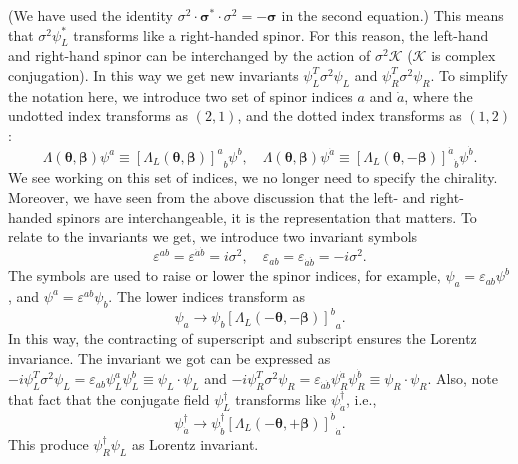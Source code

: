 \documentclass[aps,prb,superscriptaddress,nofootinbib]{revtex4}
\begin{document}
(We have used the identity $\sigma^2 \cdot \bm\sigma^* \cdot\sigma^2 = -\bm\sigma$ in the second equation.) This means that $\sigma^2 \psi_L^*$ transforms like a right-handed spinor.
For this reason, the left-hand and right-hand spinor can be interchanged by the action of $\sigma^2 \mathcal K$ ($\mathcal K$ is complex conjugation).
In this way we get new invariants $\psi_L^T \sigma^2 \psi_L$ and $\psi_R^T \sigma^2 \psi_R$.
To simplify the notation here, we introduce two set of spinor indices $a$ and $\dot a$, where the undotted index transforms as $(2,1)$, and the dotted index transforms as $(1,2)$:
\begin{equation}
	\Lambda(\bm\theta,\bm\beta) \psi^a \equiv {[\Lambda_L(\bm\theta,\bm\beta)]^a}_b \psi^b, \quad
	\Lambda(\bm\theta,\bm\beta) \psi^{\dot a} \equiv {[\Lambda_L(\bm\theta,-\bm\beta)]^{\dot a}}_{\dot b} \psi^{\dot b}.
\end{equation}
We see working on this set of indices, we no longer need to specify the chirality.
Moreover, we have seen from the above discussion that the left- and right- handed spinors are interchangeable, it is the representation that matters.
To relate to the invariants we get, we introduce two invariant symbols
\begin{equation}
	\varepsilon^{ab} = \varepsilon^{\dot a \dot b} = i\sigma^2, \quad
	\varepsilon_{ab} = \varepsilon_{\dot a \dot b} = -i\sigma^2.
\end{equation}
The symbols are used to raise or lower the spinor indices, for example, $\psi_a = \varepsilon_{ab}\psi^b$, and $\psi^a = \varepsilon^{ab}\psi_b$.
The lower indices transform as
\begin{equation}
	\psi_a \rightarrow \psi_b {[\Lambda_L(-\bm\theta,-\bm\beta)]^b}_a.
\end{equation}
In this way, the contracting of superscript and subscript ensures the Lorentz invariance.
The invariant we got can be expressed as $-i\psi_L^T \sigma^2 \psi_L = \varepsilon_{ab}\psi_L^a \psi_L^b \equiv \psi_L\cdot \psi_L$ and $-i\psi_R^T \sigma^2 \psi_R = \varepsilon_{\dot a \dot b}\psi_R^{\dot a} \psi_R^{\dot b} \equiv \psi_R\cdot \psi_R$.
Also, note that fact that the conjugate field $\psi^\dagger_L$ transforms like $\psi_{\dot a}^\dagger$, i.e.,
\begin{equation}
	\psi_{\dot a}^\dagger \rightarrow \psi_{\dot b}^\dagger {[\Lambda_L(-\bm\theta,+\bm\beta)]^{\dot b}}_{\dot a}.
\end{equation}
This produce $\psi^\dagger_R \psi_L$ as Lorentz invariant.
\end{document}
